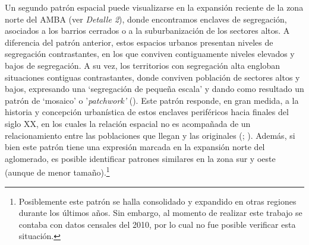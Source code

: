 \documentclass[
  spanish,
  a4paper,%
  chapterprefix=true,%
  DIV=calc,%
  twoside]{scrbook}%
\begin{document}
Un segundo patrón espacial puede visualizarse en la expansión reciente
de la zona norte del AMBA (ver \emph{Detalle 2}), donde encontramos enclaves
de segregación, asociados a los barrios cerrados o a la suburbanización
de los sectores altos. A diferencia del patrón anterior, estos espacios
urbanos presentan niveles de segregación contrastantes, en los que
conviven contiguamente niveles elevados y bajos de segregación. A su
vez, los territorios con segregación alta engloban situaciones contiguas
contrastantes, donde conviven población de sectores altos y bajos,
expresando una `segregación de pequeña escala' y dando como resultado un
patrón de `mosaico' o '\emph{patchwork'} (). Este patrón
responde, en gran medida, a la historia y concepción urbanística de
estos enclaves periféricos hacia finales del siglo XX, en los cuales la
relación espacial no es acompañada de un relacionamiento entre las
poblaciones que llegan y las originales (; ).
Además, si bien este patrón tiene una expresión marcada en la expansión
norte del aglomerado, es posible identificar patrones similares en la
zona sur y oeste (aunque de menor tamaño).\footnote{Posiblemente este patrón se halla
  consolidado y expandido en otras regiones durante los últimos años.
  Sin embargo, al momento de realizar este trabajo se contaba con
  datos censales del 2010, por lo cual no fue posible verificar esta
  situación.}
\end{document}
